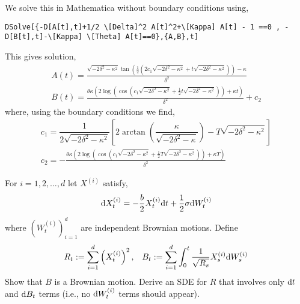 \begin{solution}[Solution]
We solve this in Mathematica without boundary conditions using,
\begin{lstlisting}
DSolve[{-D[A[t],t]+1/2 \[Delta]^2 A[t]^2+\[Kappa] A[t] - 1 ==0 , -D[B[t],t]-\[Kappa] \[Theta] A[t]==0},{A,B},t]
\end{lstlisting}

This gives solution,
\begin{align*}
    A(t) = \frac{\sqrt{-2 \delta ^2-\kappa ^2} \tan \left(\frac{1}{2} \left(2 c_1 \sqrt{-2 \delta ^2-\kappa ^2}+t \sqrt{-2 \delta ^2-\kappa ^2}\right)\right)-\kappa }{\delta ^2} \\
    B(t) = \frac{\theta  \kappa  \left(2 \log \left(\cos \left(c_1 \sqrt{-2 \delta ^2-\kappa ^2}+\frac{1}{2} t \sqrt{-2 \delta ^2-\kappa ^2}\right)\right)+\kappa  t\right)}{\delta ^2}+c_2
\end{align*}
where, using the boundary conditions we find,
\begin{align*}
    c_1 = \dfrac{1}{2\sqrt{-2\delta^2-\kappa^2}} \left[ 2\arctan\left(\dfrac{\kappa}{\sqrt{-2\delta^2-\kappa}} \right) - T\sqrt{-2\delta^2-\kappa^2} \right] \\
    c_2 =  -\frac{\theta  \kappa  \left(2 \log \left(\cos \left(c_1 \sqrt{-2 \delta ^2-\kappa ^2}+\frac{1}{2} T \sqrt{-2 \delta ^2-\kappa ^2}\right)\right)+\kappa  T\right)}{\delta ^2}
\end{align*}
\end{solution}


\begin{problem}[Exercise 9.3]
For \( i=1,2, \ldots, d \) let \( X^{(i)} \) satisfy,
    \begin{align*}
        \mathrm{d} X_t^{(i)} = -\dfrac{b}{2} X_t^{(i)} \mathrm{d} t + \dfrac{1}{2}\sigma\mathrm{d} W_t^{(i)}
    \end{align*}
    where \( (W_t^{(i)})_{i=1}^{d} \) are independent Brownian motions. Define
    \begin{align*}
        R_t := \sum_{i=1}^{d} \left(X_t^{(i)}\right)^2, && B_t := \sum_{i=1}^{d} \int_{0}^{t} \dfrac{1}{\sqrt{R_s}}X_s^{(i)} \mathrm{d} W_s^{(i)}
    \end{align*}
    Show that \( B \) is a Brownian motion. Derive an SDE for \( R \) that involves only \( \mathrm{d} t \) and \( \mathrm{d} B_t \) terms (i.e., no \( \mathrm{d} W_t^{(i)} \) terms should appear).
\end{problem}


